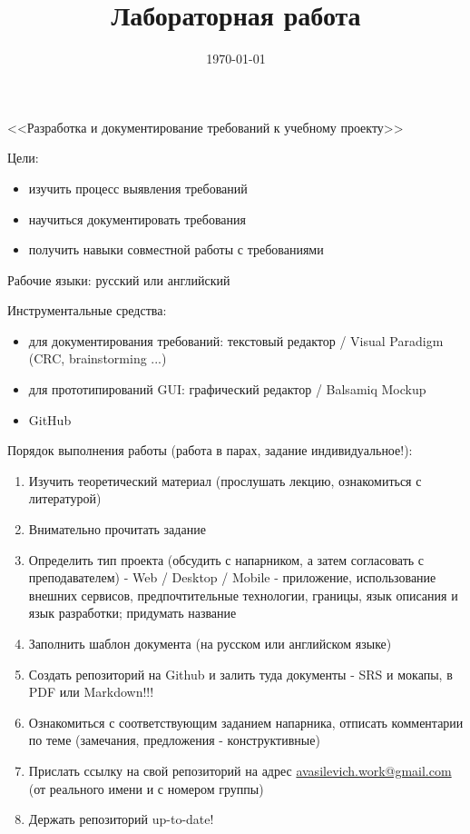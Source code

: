 \documentclass[12pt, a4paper]{article}
\begin{document}
\singlespacing

\title{Лабораторная работа }
\date{\normalsize \today}
\maketitle

\noindent
<<Разработка и документирование требований к учебному проекту>> \newline

\noindent
Цели:
\begin{itemize} \itemsep0em
    \item изучить процесс выявления требований
    \item научиться документировать требования
    \item получить навыки совместной работы с требованиями
\end{itemize}

\noindent
Рабочие языки: русский или английский  \newline

\noindent
Инструментальные средства:
\begin{itemize} \itemsep0em
    \item для документирования требований: текстовый редактор / Visual Paradigm (CRC, brainstorming ...)
    \item для прототипирований GUI: графический редактор / Balsamiq Mockup
    \item GitHub
\end{itemize}

\noindent
Порядок выполнения работы (работа в парах, задание индивидуальное!):
\begin{enumerate} \itemsep0em
    \item Изучить теоретический материал (прослушать лекцию, ознакомиться с литературой)
    \item Внимательно прочитать задание
    \item Определить тип проекта (обсудить с напарником, а затем согласовать с преподавателем) - Web / Desktop / Mobile - приложение,
          использование внешних сервисов, предпочтительные технологии, границы, язык описания и язык разработки;
          придумать название
    \item Заполнить шаблон документа (на русском или английском языке)
    \item Создать репозиторий на Github и залить туда документы - SRS и мокапы, в PDF или Markdown!!!
    \item Ознакомиться с соответствующим заданием напарника, отписать
          комментарии по теме (замечания, предложения - конструктивные)
    \item Прислать ссылку на свой репозиторий на адрес \href{mailto:avasilevich.work@gmail.com}{avasilevich.work@gmail.com}
          (от реального имени и с номером группы)
    \item Держать репозиторий up-to-date!
\end{enumerate}
\end{document}
